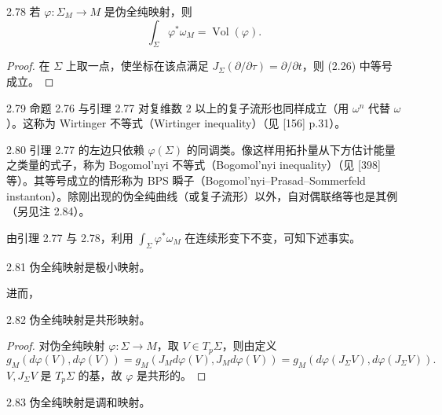 
\begin{lemma*}{2.78}
  若 $\varphi\colon\Sigma_M\to M$ 是伪全纯映射，则
  \[
    \int_\Sigma\varphi^*\omega_M=\operatorname{Vol}(\varphi).
  \]
\end{lemma*}

\begin{proof}
  在 $\Sigma$ 上取一点，使坐标在该点满足 $J_\Sigma(\partial/\partial\tau)=\partial/\partial t$，则 (2.26) 中等号成立。
\end{proof}

\begin{remark}{2.79}
  命题 2.76 与引理 2.77 对复维数 $2$ 以上的复子流形也同样成立（用 $\omega^n$ 代替 $\omega$）。这称为 Wirtinger 不等式（Wirtinger inequality）（见 [156] p.31）。
\end{remark}

\begin{remark}{2.80}
  引理 2.77 的左边只依赖 $\varphi(\Sigma)$ 的同调类。像这样用拓扑量从下方估计能量之类量的式子，称为 Bogomol'nyi 不等式（Bogomol'nyi inequality）（见 [398] 等）。其等号成立的情形称为 BPS 瞬子（Bogomol'nyi–Prasad–Sommerfeld instanton）。除刚出现的伪全纯曲线（或复子流形）以外，自对偶联络等也是其例（另见注 2.84）。
\end{remark}

由引理 2.77 与 2.78，利用 $\int_\Sigma\varphi^*\omega_M$ 在连续形变下不变，可知下述事实。

\begin{proposition}{2.81}
  伪全纯映射是极小映射。
\end{proposition}

进而，

\begin{proposition*}{2.82}
  伪全纯映射是共形映射。
\end{proposition*}

\begin{proof}
  对伪全纯映射 $\varphi\colon\Sigma\to M$，取 $V\in T_p\Sigma$，则由定义
  \[
    g_M(d\varphi(V),d\varphi(V))=g_M(J_Md\varphi(V),J_Md\varphi(V))
    =g_M(d\varphi(J_\Sigma V),d\varphi(J_\Sigma V)).
  \]
  $V,J_\Sigma V$ 是 $T_p\Sigma$ 的基，故 $\varphi$ 是共形的。
\end{proof}

\begin{corollary}{2.83}
  伪全纯映射是调和映射。
\end{corollary}

